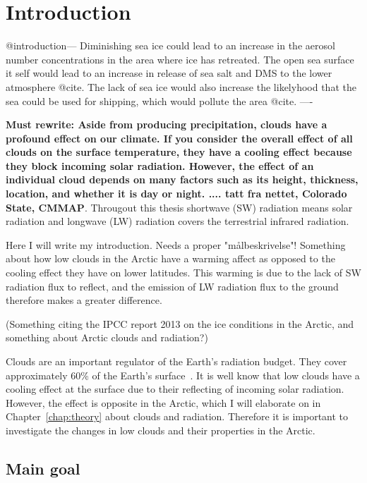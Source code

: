 \chapter{Introduction}
\label{chap:introduction}


@introduction--- %
Diminishing sea ice could lead to an increase in the aerosol number concentrations in the area where ice has retreated. The open sea surface it self would lead to an increase in release of sea salt and DMS to the lower atmosphere @cite. The lack of sea ice would also increase the likelyhood that the sea could be used for shipping, which would pollute the area @cite.
----


\textbf{Must rewrite: Aside from producing precipitation, clouds have a profound effect on our climate. If you consider the overall effect of all clouds on the surface temperature, they have a cooling effect because they block incoming solar radiation. However, the effect of an individual cloud depends on many factors such as its height, thickness, location, and whether it is day or night. .... tatt fra nettet, Colorado State, CMMAP}. Througout this thesis shortwave (SW) radiation means solar radiation and longwave (LW) radiation covers the terrestrial infrared radiation.

Here I will write my introduction. Needs a proper "målbeskrivelse"!
Something about how low clouds in the Arctic have a warming affect as opposed to the cooling effect they have on lower latitudes. This warming is due to the lack of SW radiation flux to reflect, and the emission of LW radiation flux to the ground therefore makes a greater difference.

(Something citing the IPCC report 2013 on the ice conditions in the Arctic, and something about Arctic clouds and radiation?)

Clouds are an important regulator of the Earth's radiation budget. They cover approximately 60\% of the Earth's surface~\citep{Lohmann2005}. It is well know that low clouds have a cooling effect at the surface due to their reflecting of incoming solar radiation. However, the effect is opposite in the Arctic, which I will elaborate on in Chapter~\ref{chap:theory} about clouds and radiation. Therefore it is important to investigate the changes in low clouds and their properties in the Arctic.

\section{Main goal}
